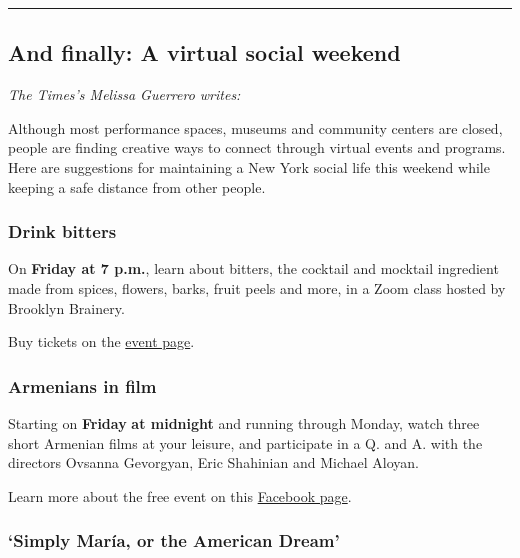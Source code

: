 \begin{center}\rule{0.5\linewidth}{\linethickness}\end{center}

\hypertarget{and-finally-a-virtual-social-weekend}{%
\subsection{And finally: A virtual social
weekend}\label{and-finally-a-virtual-social-weekend}}

\emph{The Times's Melissa Guerrero writes:}

Although most performance spaces, museums and community centers are
closed, people are finding creative ways to connect through virtual
events and programs. Here are suggestions for maintaining a New York
social life this weekend while keeping a safe distance from other
people.

\hypertarget{drink-bitters}{%
\subsubsection{Drink bitters}\label{drink-bitters}}

On \textbf{Friday at 7 p.m.}, learn about bitters, the cocktail and
mocktail ingredient made from spices, flowers, barks, fruit peels and
more, in a Zoom class hosted by Brooklyn Brainery.

Buy tickets on the
\href{https://brooklynbrainery.com/courses/drink-bitters-online-class}{event
page}.

\hypertarget{armenians-in-film}{%
\subsubsection{\texorpdfstring{\textbf{Armenians in
film}}{Armenians in film}}\label{armenians-in-film}}

Starting on \textbf{Friday} \textbf{at midnight} and running through
Monday, watch three short Armenian films at your leisure, and
participate in a Q. and A. with the directors Ovsanna Gevorgyan, Eric
Shahinian and Michael Aloyan.

Learn more about the free event on this
\href{https://www.facebookcorewwwi.onion/events/294771018623803/}{Facebook
page}.

\hypertarget{simply-maruxeda-or-the-american-dream}{%
\subsubsection{\texorpdfstring{\textbf{`Simply María, or the American
Dream'}}{`Simply María, or the American Dream'}}\label{simply-maruxeda-or-the-american-dream}}

